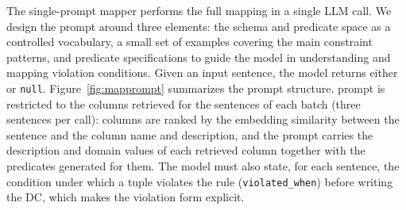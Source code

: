 The single-prompt mapper performs the full mapping in a single LLM call. 
We design the prompt around three elements: the schema and predicate space as a controlled vocabulary, a small set of examples covering the main constraint patterns, and predicate specifications to guide the model in understanding and mapping violation conditions. Given an input sentence, the model returns either  or \texttt{null}. 
Figure~\ref{fig:mapprompt} summarizes the prompt structure.
 prompt is restricted to the columns retrieved for
the sentences of each batch (three sentences per call): columns are ranked by
the embedding similarity between the sentence and the column name and
description, and the prompt carries the description and
domain values of each retrieved column together with the
predicates generated for them. The model must also state, for each sentence,
the condition under which a tuple violates the rule (\texttt{violated\_when})
before writing the DC, which makes the violation form explicit.





